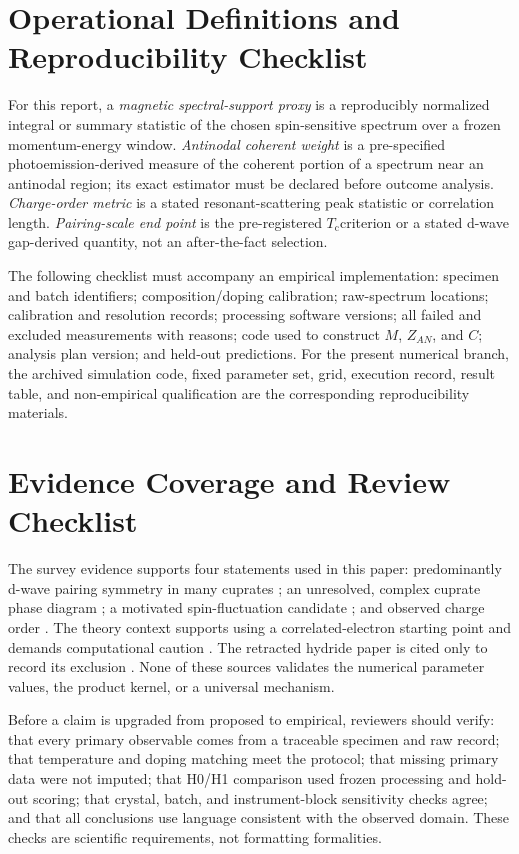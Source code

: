 \documentclass[conference]{IEEEtran}
\newcommand{\Tc}{\ensuremath{T_{\mathrm{c}}}}
\begin{document}
\section{Operational Definitions and Reproducibility Checklist}

For this report, a \emph{magnetic spectral-support proxy} is a reproducibly normalized integral or summary statistic of the chosen spin-sensitive spectrum over a frozen momentum-energy window. \emph{Antinodal coherent weight} is a pre-specified photoemission-derived measure of the coherent portion of a spectrum near an antinodal region; its exact estimator must be declared before outcome analysis. \emph{Charge-order metric} is a stated resonant-scattering peak statistic or correlation length. \emph{Pairing-scale end point} is the pre-registered \Tc criterion or a stated d-wave gap-derived quantity, not an after-the-fact selection.

The following checklist must accompany an empirical implementation: specimen and batch identifiers; composition/doping calibration; raw-spectrum locations; calibration and resolution records; processing software versions; all failed and excluded measurements with reasons; code used to construct $M$, $Z_{AN}$, and $C$; analysis plan version; and held-out predictions. For the present numerical branch, the archived simulation code, fixed parameter set, grid, execution record, result table, and non-empirical qualification are the corresponding reproducibility materials.

\section{Evidence Coverage and Review Checklist}

The survey evidence supports four statements used in this paper: predominantly d-wave pairing symmetry in many cuprates \cite{tsuei2000}; an unresolved, complex cuprate phase diagram \cite{keimer2015}; a motivated spin-fluctuation candidate \cite{scalapino2012}; and observed charge order \cite{comin2016}. The theory context supports using a correlated-electron starting point \cite{lee2006} and demands computational caution \cite{leblanc2015}. The retracted hydride paper is cited only to record its exclusion \cite{snider2020}. None of these sources validates the numerical parameter values, the product kernel, or a universal mechanism.

Before a claim is upgraded from proposed to empirical, reviewers should verify: that every primary observable comes from a traceable specimen and raw record; that temperature and doping matching meet the protocol; that missing primary data were not imputed; that H0/H1 comparison used frozen processing and hold-out scoring; that crystal, batch, and instrument-block sensitivity checks agree; and that all conclusions use language consistent with the observed domain. These checks are scientific requirements, not formatting formalities.
\end{document}
